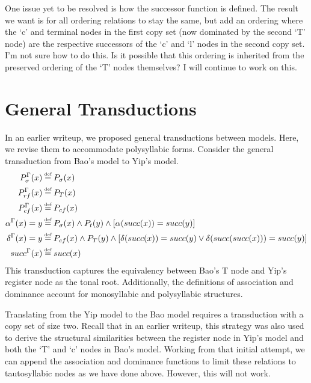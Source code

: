 \documentclass{article}
\newcommand\myeq{\mathrel{\stackrel{\makebox[0pt]{\mbox{\normalfont\tiny def}}}{=}}}
\begin{document}
One issue yet to be resolved is how the successor function is defined. The result we want is for all ordering relations to stay the same, but add an ordering where the `c' and terminal nodes in the first copy set (now dominated by the second `T' node) are the respective successors of the `c' and `l' nodes in the second copy set. I'm not sure how to do this. Is it possible that this ordering is inherited from the preserved ordering of the `T' nodes themselves? I will continue to work on this.
\section{General Transductions}
In an earlier writeup, we proposed general transductions between models. Here, we revise them to accommodate polysyllabic forms. Consider the general transduction from Bao's model to Yip's model.
\begin{equation}
\begin{aligned}
P^{\Gamma}_{\sigma}(x)&\myeq P_{\sigma}(x) \\
P^{\Gamma}_{rf}(x)&\myeq P_{T}(x) \\
P^{\Gamma}_{cf}(x)&\myeq P_{cf}(x) \\
\alpha^{\Gamma}(x)=y&\myeq P_{\sigma}(x)\land P_{t}(y)\land [\alpha(succ(x)) = succ(y)] \\
\delta^{\Gamma}(x)=y&\myeq P_{cf}(x)\land P_{T}(y) \land [\delta(succ(x))=succ(y) \lor \delta(succ(succ(x)))=succ(y)]\\
succ^{\Gamma}(x)&\myeq succ(x)
\end{aligned}
\end{equation}
This transduction captures the equivalency between Bao's T node and Yip's register node as the tonal root. Additionally, the definitions of association and dominance account for monosyllabic and polysyllabic structures. \par
Translating from the Yip model to the Bao model requires a transduction with a copy set of size two. Recall that in an earlier writeup, this strategy was also used to derive the structural similarities between the register node in Yip's model and both the `T' and `c' nodes in Bao's model. Working from that initial attempt, we can append the association and dominance functions to limit these relations to tautosyllabic nodes as we have done above. However, this will not work.
\end{document}
